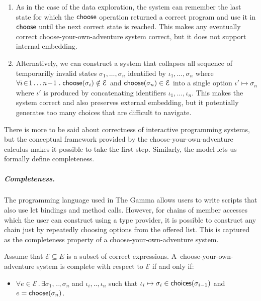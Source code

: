 \documentclass[a4paper,UKenglish,cleveref, autoref, thm-restate]{lipics-v2021}
\newcommand{\ident}[1]{\textsf{#1}}
\newcommand{\select}{\textnormal{\ident{choose}}}
\newcommand{\choices}{\textnormal{\ident{choices}}}
\begin{document}
\begin{enumerate}
\setlength{\itemsep}{5pt}
\item As in the case of the data exploration, the system can remember the last state for which
  the $\select$ operation returned a correct program and use it in $\select$ until the next correct state is
  reached. This makes any eventually correct choose-your-own-adventure system correct, but it
  does not support internal embedding.

\item Alternatively, we can construct a system that collapses all sequence of temporarilly invalid states
  $\sigma_1, \ldots, \sigma_n$ identified by $\iota_1, \ldots, \sigma_n$ where
  $\forall i\!\in\! 1\ldots n\!-\! 1\;.\;\select(\sigma_i)\notin\mathcal{E}$ and $\select(\sigma_n)\in\mathcal{E}$
  into a single option $\iota' \mapsto \sigma_n$ where $\iota'$ is produced by concatenating
  identifiers $\iota_1,\ldots,\iota_n$.
  This makes the system correct and also preserves external embedding, but it potentially
  generates too many choices that are difficult to navigate.
\end{enumerate}

There is more to be said about correctness of interactive programming systems, but the
conceptual framework provided by the choose-your-own-adventure calculus makes it possible to
take the first step. Similarly, the model lets us formally define completeness.

\subparagraph{Completeness.}
The programming language used in The Gamma allows users to write scripts that also use let bindings
and method calls. However, for chains of member accesses which the user can construct using
a type provider, it is possible to construct any chain just by repeatedly choosing options from
the offered list. This is captured as the completeness property of a choose-your-own-adventure system.

\begin{definition}[Completeness]
Assume that $\mathcal{E}\subseteq E$ is a subset of correct expressions.
A~choose-your-own-adventure system is complete with respect to $\mathcal{E}$ if and only if:
\begin{itemize}
\item $\forall e\!\in\!\mathcal{E}\,.\,\exists \sigma_1,..,\sigma_n$ and $\iota_i,..,\iota_n$ such that
  $\iota_i\mapsto\sigma_i \in \choices(\sigma_{i-1})$ and $e=\select(\sigma_n)$.
\end{itemize}
\end{definition}
\end{document}
